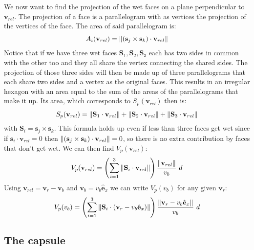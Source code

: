 \documentclass[a4paper,12pt]{article}
\begin{document}
We now want to find the projection of the wet faces on a plane perpendicular to $\mathbf{v}_{rel}$. The projection of a face is a parallelogram with as vertices the projection of the vertices of the face. The area of said parallelogram is:
%
\begin{equation}\label{EqAP}
A_i(\mathbf{v}_{rel}) = \norm{(\mathbf{s}_j \times \mathbf{s}_k) \cdot \mathbf{v}_{rel}}
\end{equation} 
%
Notice that if we have three wet faces $\mathbf{S}_1, \mathbf{S}_2, \mathbf{S}_3$ each has two sides in common with the other too and they all share the vertex connecting the shared sides. The projection of those three sides will then be made up of three parallelograms that each share two sides and a vertex as the original faces. This results in an irregular hexagon with an area equal to the sum of the areas of the parallelograms that make it up. Its area, which corresponds to $S_p(\mathbf{v}_{rel})$ then is:
%
\begin{equation}\label{EqSp}
S_p(\mathbf{v}_{rel}) = \norm{\mathbf{S}_1 \cdot \mathbf{v}_{rel}} + \norm{\mathbf{S}_2 \cdot \mathbf{v}_{rel}} + \norm{\mathbf{S}_3 \cdot \mathbf{v}_{rel}}
\end{equation} 
%
with $\mathbf{S}_i = \mathbf{s}_j \times \mathbf{s}_k$. This formula holds up even if less than three faces get wet since if $\mathbf{s}_i \cdot \mathbf{v}_{rel} = 0$ then $\norm{(\mathbf{s}_j \times \mathbf{s}_k) \cdot \mathbf{v}_{rel}} = 0$, so there is no extra contribution by faces that don't get wet. We can then find $V_p(\mathbf{v}_{rel})$: 
%
\begin{equation}\label{EqVp}
V_p(\mathbf{v}_{rel}) = \left( \sum\limits_{i=1}^3  \norm{\mathbf{S}_i \cdot \mathbf{v}_{rel}} \right) \frac{\norm{\mathbf{v}_{rel}}}{v_b} \ d
\end{equation} 
%
Using $\mathbf{v}_{rel} =\mathbf{v}_r - \mathbf{v}_b$ and $\mathbf{v}_b=v_b\hat{\mathbf{e}}_x$ we can write $V_p(v_b)$ for any given $\mathbf{v}_r$:
%
\begin{equation}\label{EqVpVb}
V_p(v_b) = \left( \sum\limits_{i=1}^3  \norm{\mathbf{S}_i \cdot (\mathbf{v}_r - v_b\hat{\mathbf{e}}_x)} \right) \frac{\norm{\mathbf{v}_r - v_b\hat{\mathbf{e}}_x}}{v_b} \ d
\end{equation} 
%

\subsection{The capsule}
\end{document}
